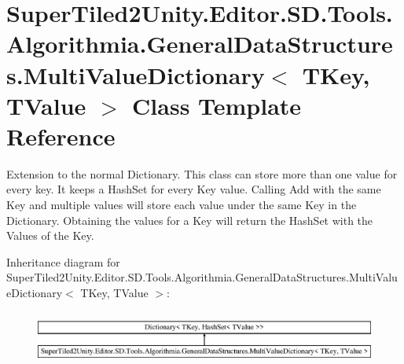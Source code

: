 \hypertarget{class_super_tiled2_unity_1_1_editor_1_1_s_d_1_1_tools_1_1_algorithmia_1_1_general_data_structures_1_1_multi_value_dictionary}{}\section{Super\+Tiled2\+Unity.\+Editor.\+S\+D.\+Tools.\+Algorithmia.\+General\+Data\+Structures.\+Multi\+Value\+Dictionary$<$ T\+Key, T\+Value $>$ Class Template Reference}
\label{class_super_tiled2_unity_1_1_editor_1_1_s_d_1_1_tools_1_1_algorithmia_1_1_general_data_structures_1_1_multi_value_dictionary}


Extension to the normal Dictionary. This class can store more than one value for every key. It keeps a Hash\+Set for every Key value. Calling Add with the same Key and multiple values will store each value under the same Key in the Dictionary. Obtaining the values for a Key will return the Hash\+Set with the Values of the Key.  


Inheritance diagram for Super\+Tiled2\+Unity.\+Editor.\+S\+D.\+Tools.\+Algorithmia.\+General\+Data\+Structures.\+Multi\+Value\+Dictionary$<$ T\+Key, T\+Value $>$\+:\begin{figure}[H]
\begin{center}
\leavevmode
\includegraphics[height=1.772152cm]{class_super_tiled2_unity_1_1_editor_1_1_s_d_1_1_tools_1_1_algorithmia_1_1_general_data_structures_1_1_multi_value_dictionary}
\end{center}
\end{figure}
